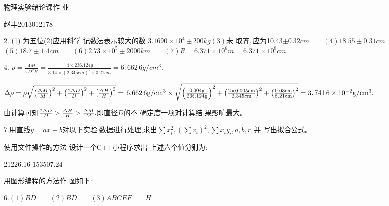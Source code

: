 \documentclass{ctexart}
\begin{document}
\bigskip 物理实验绪论课作%
业

赵丰2013012178

2. (1) 为五位\qquad (2)应用科学%
记数法表示较大的数%
\qquad $3.1690\times 10^{4}\pm 200\unit{kg}$\qquad $\left( 3\right) $未%
取齐$,$应为10.43$\pm 0.32\unit{cm}\qquad \left(
4\right) 18.55\pm 0.31\unit{cm}$ \qquad $\left( 5\right) 18.7\pm 1.4\unit{cm}%
\qquad \left( 6\right) 2.73\times 10^{5}\pm 2000\unit{km}\qquad \left(
7\right) R=6.371\times 10^{6}\unit{m}=6.371\times 10^{8}\unit{cm}$

4. $\rho =\frac{4M}{\pi D^{2}H}=\frac{4\times 236.124\unit{g}}{3.14\times
\left( 2.345\unit{cm}\right) ^{2}\times 8.21\unit{cm}}=\allowbreak
6.\,\allowbreak 662\,6\unit{g}/\unit{cm}^{3}.$

$\Delta \rho =\rho \sqrt{\left( \frac{\Delta M}{M}\right) ^{2}+\left( \frac{%
2\Delta D}{D}\right) ^{2}+\left( \frac{\Delta H}{H}\right) ^{2}}%
=\,\allowbreak 6.662\,6\unit{g}/\unit{cm}^{3}\times \sqrt{\left( \frac{0.004%
\unit{g}}{236.124\unit{g}}\right) ^{2}+\left( \frac{2\times 0.005\unit{cm}}{%
2.345\unit{cm}}\right) ^{2}+\left( \frac{0.03\unit{cm}}{8.21\unit{cm}}%
\right) ^{2}}=3.\,\allowbreak 741\,6\times 10^{-2}\unit{g}/\unit{cm}^{3}.$

由计算可知\qquad $\frac{2\Delta D}{D}>\frac{%
\Delta H}{H}>\frac{\Delta M}{M},$即直径$D$的不%
确定度一项对计算结%
果影响最大。

7.用直线$y=ax+b$对以下实验%
数据进行处理,求出$\sum
x_{i}^{2},\left( \sum x_{i}\right) ^{2},\sum x_{i}y_{i},a,b,r,$并%
写出拟合公式。

使用文件操作的方法%
设计一个C++小程序求出%
上述六个值分别为:

21226.16 153507.24    

用图形编程的方法作%
图如下:


6.\qquad $\left( 1\right) BD\qquad \left( 2\right) BD\qquad \left( 3\right)
ABCEF\qquad H$
\end{document}
